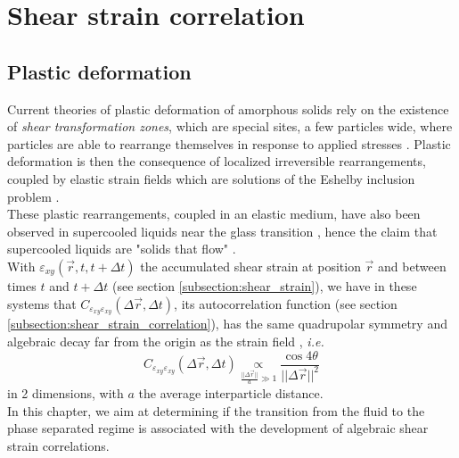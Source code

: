 \documentclass[class=report, float=false, crop=false]{standalone}
\begin{document}
\chapter{Shear strain correlation}
\label{chap:strain}

\section{Plastic deformation}
\label{section:plastic_deformation}


Current theories of plastic deformation of amorphous solids rely on the existence of \textit{shear transformation zones}, which are special sites, a few particles wide, where particles are able to rearrange themselves in response to applied stresses \cite{falk1998dynamics}. Plastic deformation is then the consequence of localized irreversible rearrangements, coupled by elastic strain fields \cite{nicolas2014spatiotemporal} which are solutions of the Eshelby inclusion problem \cite{eshelby1959elastic}.\\

These plastic rearrangements, coupled in an elastic medium, have also been observed in supercooled liquids near the glass transition \cite{chattoraj2013elastic, illing2016strain, hassani2018long}, hence the claim that supercooled liquids are "solids that flow" \cite{dyre2006colloquium}.\\

With $\varepsilon_{xy}(\vec{r}, t, t + \Delta t)$ the accumulated shear strain at position $\vec{r}$ and between times $t$ and $t + \Delta t$ (see section \ref{subsection:shear_strain}), we have in these systems that $C_{\varepsilon_{xy}\varepsilon_{xy}}(\Delta \vec{r}, \Delta t)$, its autocorrelation function (see section \ref{subsection:shear_strain_correlation}), has the same quadrupolar symmetry and algebraic decay far from the origin as the strain field \cite{illing2016strain, hassani2018long}, \textit{i.e.}
\begin{equation}
C_{\varepsilon_{xy}\varepsilon_{xy}}(\Delta \vec{r}, \Delta t) \underset{\frac{||\Delta \vec{r}||}{a} \gg 1}{\propto} \frac{\cos4\theta}{||\Delta \vec{r}||^2}
\label{css_eshelby}
\end{equation}
in 2 dimensions, with $a$ the average interparticle distance.\\

In this chapter, we aim at determining if the transition from the fluid to the phase separated regime is associated with the development of algebraic shear strain correlations.
\end{document}
